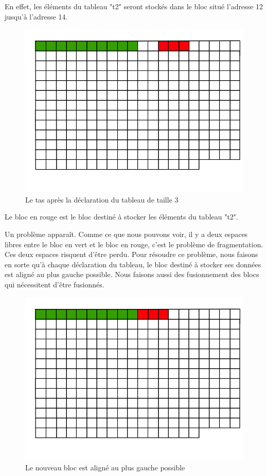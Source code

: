 \documentclass[a4paper,12pt]{report}
\begin{document}
En effet, les éléments du tableau "t2" seront stockés dans le bloc situé l'adresse 12 jusqu'à l'adresse 14.

\begin{figure}[H]
\begin{center}
	\includegraphics[scale=0.4]{tas3}
	\caption{Le tas après la déclaration du tableau de taille 3}
\end{center}
\end{figure}

Le bloc en rouge est le bloc destiné à stocker les éléments du tableau "t2".

Un problème apparaît. Comme ce que nous pouvons voir, il y a deux espaces libres entre le bloc en vert et le bloc en rouge, c'est le problème de fragmentation. Ces deux espaces risquent d'être perdu. Pour résoudre ce problème, nous faisons en sorte qu'à chaque déclaration du tableau, le bloc destiné à stocker ses données est aligné au plus gauche possible. Nous faisons aussi des fusionnement des blocs qui nécessitent d'être fusionnés.

\begin{figure}[H]
\begin{center}
	\includegraphics[scale=0.4]{tas4}
	\caption{Le nouveau bloc est aligné au plus gauche possible}
\end{center}
\end{figure}
\end{document}
